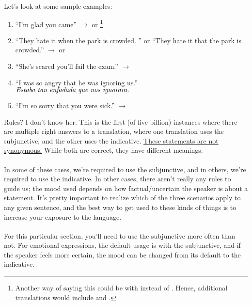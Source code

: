 Let's look at some sample examples: 
\begin{enumerate}[noitemsep]
	\item ``I'm glad you came'' $\rightarrow$  or  \footnote{Another way of saying this could be with  instead of .  Hence, additional translations would include  and .}
	\item ``They hate it when the park is crowded. '' or ``They hate it that the park is crowded.'' $\rightarrow$  or 
	\item ``She's scared you'll fail the exam.'' $\rightarrow$ 
	\item ``I was so angry that he was ignoring us.'' $\textit{Estaba tan enfadada que nos ignorara.}$
	\item ``I'm so sorry that you were sick.'' $\rightarrow$ 
\end{enumerate}

\begin{conf}{Rules? I don't know her.}
	This is the first (of five billion) instances where there are multiple right answers to a translation, where one translation uses the subjunctive, and the other uses the indicative. \underline{These statements are not synonymous.} While both are correct, they have different meanings. \\
	
\\	In some of these cases, we're required to use the subjunctive, and in others, we're required to use the indicative. In other cases, there aren't really any rules to guide us; the mood used depends on how factual/uncertain the speaker is about a statement. It's pretty important to realize which of the three scenarios apply to any given sentence, and the best way to get used to these kinds of things is to increase your exposure to the language. \\

\\ For this particular section, you'll need to use the subjunctive more often than not. For emotional expressions, the default usage is with the subjunctive, and if the speaker feels more certain, the mood can be changed from its default to the indicative. 
\end{conf}

